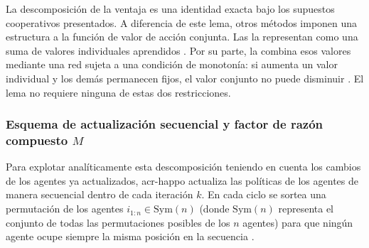 La descomposición de la ventaja es una identidad exacta bajo los supuestos cooperativos presentados. A diferencia de este lema, otros métodos imponen una estructura a la función de valor de acción conjunta. Las  la representan como una suma de valores individuales aprendidos \cite{vdn}. Por su parte, la  combina esos valores mediante una red sujeta a una condición de monotonía: si aumenta un valor individual y los demás permanecen fijos, el valor conjunto no puede disminuir \cite{qmix}. El lema no requiere ninguna de estas dos restricciones.

\subsubsection[Esquema de actualización secuencial y factor de razón compuesto M]{Esquema de actualización secuencial y factor de razón compuesto $M$}

Para explotar analíticamente esta descomposición teniendo en cuenta los cambios de los agentes ya actualizados, \acrshort{acr-happo} actualiza las políticas de los agentes de manera secuencial dentro de cada iteración $k$. En cada ciclo se sortea una permutación de los agentes $i_{1:n} \in \text{Sym}(n)$ (donde $\text{Sym}(n)$ representa el conjunto de todas las permutaciones posibles de los $n$ agentes) para que ningún agente ocupe siempre la misma posición en la secuencia \cite{kuba2021trust,wang2023order}.

